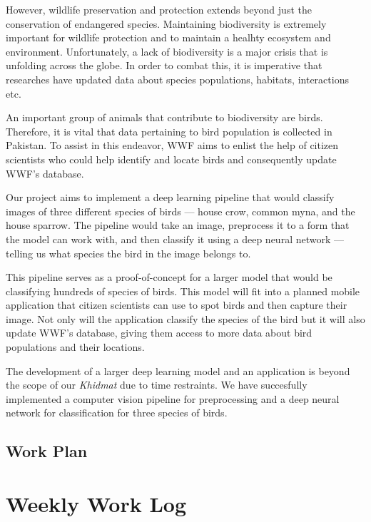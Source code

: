 \documentclass[11pt]{article}
\begin{document}
However, wildlife preservation and protection extends beyond just the conservation of 
endangered species. Maintaining biodiversity is extremely important for 
wildlife protection and to maintain a healhty ecosystem and environment. Unfortunately, 
a lack of biodiversity is a major crisis that is unfolding across the globe. In order to 
combat this, it is imperative that researches have updated data about species populations, 
habitats, interactions etc. 

An important group of animals that contribute to biodiversity are birds. Therefore, 
it is vital that data pertaining to bird population is collected in Pakistan. 
To assist in this endeavor, WWF aims to enlist the help of citizen scientists who could 
help identify and locate birds and consequently update WWF's database. 

Our project aims to implement a deep learning pipeline that would 
classify images of three different species of birds --- house crow, common 
myna, and the house sparrow. The pipeline would take an image, preprocess it 
to a form that the model can work with, and then classify it using a deep 
neural network --- telling us what species the bird in the image belongs to. 

This pipeline serves as a proof-of-concept for a larger model that 
would be classifying hundreds of species of birds. This model will fit 
into a planned mobile application that citizen scientists can use to spot birds 
and then capture their image. Not only will the application classify the 
species of the bird but it will also update WWF's database, giving them 
access to more data about bird populations and their locations. 

The development of a larger deep learning model and an application is 
beyond the scope of our \textit{Khidmat} due to time restraints. 
We have succesfully implemented a computer vision pipeline for preprocessing 
and a deep neural network for classification for three species of birds.

\subsection{Work Plan}
\newpage %

\section{Weekly Work Log}
\end{document}
